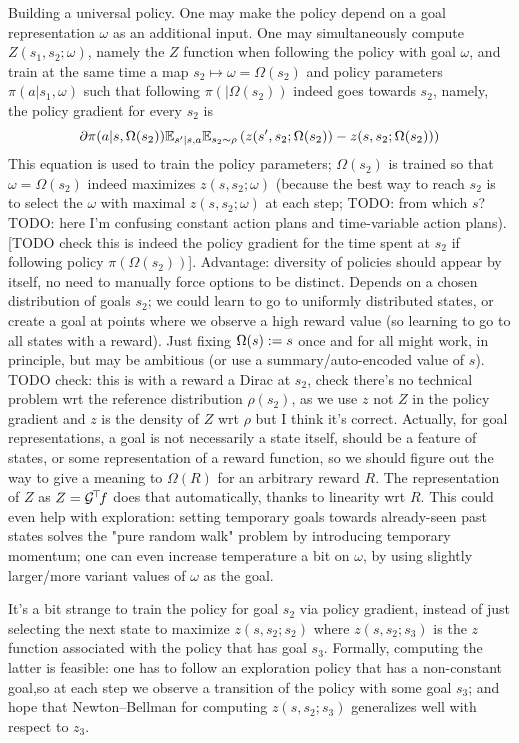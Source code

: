 \documentclass[11pt,a4paper]{article}
\newcommand{\green}{\mathcal{G}}
\begin{document}
Building a universal policy. One may make the policy depend on a goal
representation $\omega$ as an additional input. One may simultaneously
compute $Z(s_1,s_2;\omega)$, namely the $Z$ function when following the
policy with goal $\omega$, and train at the same time a map $s_2\mapsto \omega=\Omega(s_2)$ and
policy parameters $\pi(a|s_1,\omega)$ such that following
$\pi(|\Omega(s_2))$ indeed goes towards $s_2$, namely, the policy
gradient for every $s_2$ is
\begin{equation}
\partial \pi(a|s,\Omega(s_2))\mathbb{E}_{s'|s,a} \mathbb{E}_{s_2\sim \rho} \,
(z(s',s_2;\Omega(s_2))-z(s,s_2;\Omega(s_2)))
\end{equation}
This equation is used to train the policy parameters; $\Omega(s_2)$ is
trained so that $\omega=\Omega(s_2)$ indeed maximizes $z(s,s_2;\omega)$
(because the best way to reach $s_2$ is to select the $\omega$ with
maximal $z(s,s_2;\omega)$ at each step; TODO: from which $s$? TODO: here
I'm confusing constant action plans and time-variable action plans).
[TODO check this is indeed the policy gradient for the time spent at
$s_2$ if following policy $\pi(\Omega(s_2))$]. Advantage: diversity of
policies should appear by itself, no need to manually force options to be
distinct. Depends on a chosen distribution of goals $s_2$; we could learn
to go to uniformly distributed states, or create a goal at points where
we observe a high reward value (so learning to go to all states with a
reward). Just fixing $\Omega(s)\mathrel{\mathop{:}}= s$ once and for all might work, in
principle, but may be ambitious (or use a summary/auto-encoded value of
$s$). TODO check:
this is with a reward a Dirac at $s_2$, check there's no technical
problem wrt the reference distribution $\rho(s_2)$, as we use $z$ not $Z$
in the policy gradient and $z$ is the density of $Z$ wrt $\rho$ but I
think it's correct. Actually, for goal representations, a goal is not
necessarily a state itself, should be a feature of states, or some
representation of a reward function, so we should figure out the way to
give a meaning to $\Omega(R)$ for an arbitrary reward $R$. The
representation of $Z$ as $Z=\transp{\green}f$ does that automatically,
thanks to linearity wrt $R$. This could even help with exploration:
setting temporary goals towards already-seen past states solves the "pure
random walk" problem by introducing temporary momentum; one can even
increase temperature a bit on $\omega$, by using slightly larger/more
variant values of $\omega$ as the goal.

It's a bit strange to train the policy for goal $s_2$ via policy gradient,
instead of just selecting the next state to maximize
$z(s,s_2;s_2)$ where $z(s,s_2;s_3)$ is the $z$ function associated with
the policy that has goal $s_3$. Formally, computing the latter is
feasible: one has to follow an exploration policy that has a non-constant
goal,so at each step we observe a transition of the policy with some goal
$s_3$; and hope that Newton--Bellman for computing $z(s,s_2;s_3)$
generalizes well with respect to $z_3$.
\end{document}
